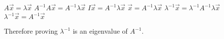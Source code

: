\newline
		\begin{center}
		    $A\vec{x}=\lambda\vec{x}$
		    \newline
		    $A^{-1}A\vec{x}=A^{-1}\lambda\vec{x}$
		    \newline
		    $I\vec{x}=A^{-1}\lambda\vec{x}$
		    \newline
		    $\vec{x}=A^{-1}\lambda\vec{x}$
		    \newline
		    $\lambda^{-1}\vec{x}=\lambda^{-1}A^{-1}\lambda\vec{x}$
		    \newline
		    $\lambda^{-1}\vec{x}=A^{-1}\vec{x}$
		    \newline
		\end{center}
		Therefore proving $\lambda^{-1}$ is an eigenvalue of $A^{-1}$.
